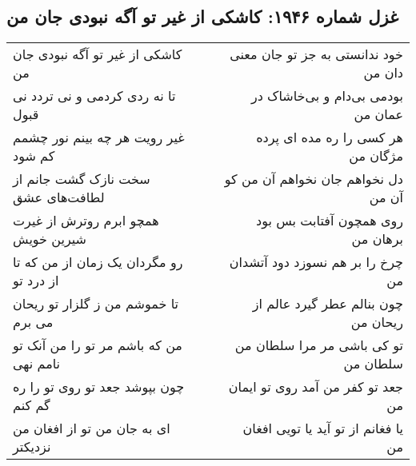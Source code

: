 \begin{center}
\section*{غزل شماره ۱۹۴۶: کاشکی از غیر تو آگه نبودی جان من}
\label{sec:1946}
\begin{longtable}{l p{0.5cm} r}
کاشکی از غیر تو آگه نبودی جان من
&&
خود ندانستی به جز تو جان معنی دان من
\\
تا نه ردی کردمی و نی تردد نی قبول
&&
بودمی بی‌دام و بی‌خاشاک در عمان من
\\
غیر رویت هر چه بینم نور چشمم کم شود
&&
هر کسی را ره مده ای پرده مژگان من
\\
سخت نازک گشت جانم از لطافت‌های عشق
&&
دل نخواهم جان نخواهم آن من کو آن من
\\
همچو ابرم روترش از غیرت شیرین خویش
&&
روی همچون آفتابت بس بود برهان من
\\
رو مگردان یک زمان از من که تا از درد تو
&&
چرخ را بر هم نسوزد دود آتشدان من
\\
تا خموشم من ز گلزار تو ریحان می برم
&&
چون بنالم عطر گیرد عالم از ریحان من
\\
من که باشم مر تو را من آنک تو نامم نهی
&&
تو کی باشی مر مرا سلطان من سلطان من
\\
چون بپوشد جعد تو روی تو را ره گم کنم
&&
جعد تو کفر من آمد روی تو ایمان من
\\
ای به جان من تو از افغان من نزدیکتر
&&
یا فغانم از تو آید یا تویی افغان من
\\
\end{longtable}
\end{center}
